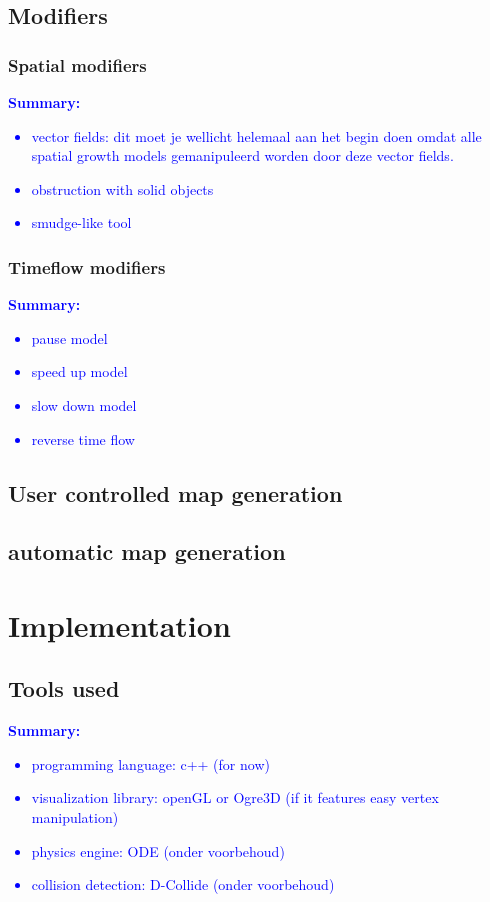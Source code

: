 \documentclass{article}
\newcommand{\inhoud}[1]{\textcolor{blue}{\textbf{Summary: }\it{#1}}}
\begin{document}
\subsection{Modifiers}

\subsubsection{Spatial modifiers}

\inhoud{
\begin{itemize}
\item vector fields: dit moet je wellicht helemaal aan het begin doen omdat alle spatial growth models
gemanipuleerd worden door deze vector fields.
\item obstruction with solid objects
\item smudge-like tool
\end{itemize}
}

\subsubsection{Timeflow modifiers}
\inhoud{
\begin{itemize}
\item pause model
\item speed up model
\item slow down model
\item reverse time flow
\end{itemize}
}


\subsection{User controlled map generation}

\subsection{automatic map generation} 


\section{Implementation}
\subsection{Tools used}
\inhoud{ 
\begin{itemize}
\item programming language: c++ (for now)
\item visualization library: openGL or Ogre3D (if it features easy vertex manipulation) 
\item physics engine: ODE (onder voorbehoud)  
\item collision detection: D-Collide (onder voorbehoud)
\end{itemize}
}
\end{document}

